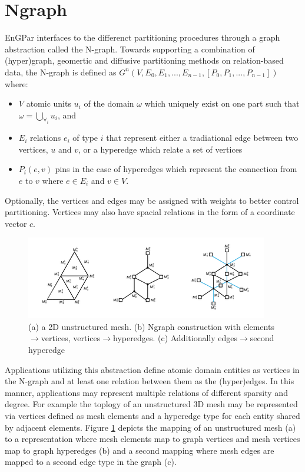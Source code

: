 \documentclass[a4paper]{article}
\begin{document}
\section{Ngraph}
EnGPar interfaces to the differenct partitioning procedures through a graph abstraction called the N-graph. Towards supporting a combination of (hyper)graph, geomertic and diffusive partitioning methods on relation-based data, the N-graph is defined as $G^n(V,E_0,E_1,...,E_{n-1},[P_0,P_1,...,P_{n-1}])$ where:
\begin{itemize}
  \item $V$ atomic units $u_i$ of the domain $\omega$ which uniquely exist on one
    part such that $\omega = \bigcup_{\forall_i}u_i$, and 
  \item $E_i$ relations $e_i$ of type $i$ that represent either a tradiational edge between two vertices, $u$ and $v$, or a hyperedge which relate a set of vertices
  \item $P_i(e,v)$ pins in the case of hyperedges which represent the connection
    from $e$ to $v$ where $e \in E_i$ and $v \in V$.
\end{itemize}
Optionally, the vertices and edges may be assigned with weights to better control partitioning. Vertices may also have spacial relations in the form of a coordinate vector $c$.

\begin{figure}[!ht]
  \centering
  \includegraphics[width=\textwidth]{exampleMesh2Graph.png}
  \caption{(a) a 2D unstructured mesh. (b) Ngraph construction with elements$\rightarrow$vertices, vertices$\rightarrow$hyperedges. (c) Additionally edges$\rightarrow$second hyperedge}
  \label{fig:Mesh2Graph}
\end{figure}

Applications utilizing this abstraction define atomic domain entities as vertices in the N-graph and at least one relation between them as the (hyper)edges. In this manner, applications may represent multiple relations of different sparsity and degree. For example the toplogy of an unstructured 3D mesh may be represented via vertices defined as mesh elements and a hyperedge type for each entity shared by adjacent elements. Figure \ref{fig:Mesh2Graph} depicts the mapping of an unstructured mesh (a) to a representation where mesh elements map to graph vertices and mesh vertices map to graph hyperedges (b) and a second mapping where mesh edges are mapped to a second edge type in the graph (c).
\end{document}

